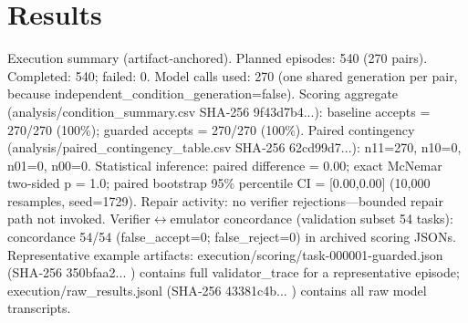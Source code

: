 \documentclass[conference]{IEEEtran}
\begin{document}
\section{Results}
Execution summary (artifact‑anchored). Planned episodes: 540 (270 pairs). Completed: 540; failed: 0. Model calls used: 270 (one shared generation per pair, because independent\_condition\_generation=false). Scoring aggregate (analysis/condition\_summary.csv SHA‑256 9f43d7b4...): baseline accepts = 270/270 (100\%); guarded accepts = 270/270 (100\%). Paired contingency (analysis/paired\_contingency\_table.csv SHA‑256 62cd99d7...): n11=270, n10=0, n01=0, n00=0. Statistical inference: paired difference = 0.00; exact McNemar two‑sided p = 1.0; paired bootstrap 95\% percentile CI = [0.00,0.00] (10,000 resamples, seed=1729). Repair activity: no verifier rejections---bounded repair path not invoked. Verifier\ensuremath{\leftrightarrow}emulator concordance (validation subset 54 tasks): concordance 54/54 (false\_accept=0; false\_reject=0) in archived scoring JSONs. Representative example artifacts: execution/scoring/task-000001-guarded.json (SHA‑256 350bfaa2... ) contains full validator\_trace for a representative episode; execution/raw\_results.jsonl (SHA‑256 43381c4b... ) contains all raw model transcripts.
\end{document}
